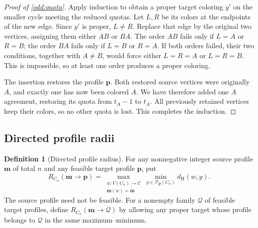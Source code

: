 \documentclass[11pt,reqno]{amsart}
\numberwithin{equation}{section}
\theoremstyle{definition}
\newtheorem{definition}[theorem]{Definition}
\theoremstyle{remark}
\begin{document}
\begin{proof}[Proof of \cref{odd:quota}]
Apply induction to obtain a proper target coloring $y'$ on the
smaller cycle meeting the reduced quotas. Let $L,R$ be its colors at
the endpoints of the new edge. Since $y'$ is proper, $L\ne R$.
Replace that edge by the original two vertices, assigning them
either $AB$ or $BA$. The order $AB$ fails only if $L=A$ or $R=B$;
the order $BA$ fails only if $L=B$ or $R=A$.
If both orders failed, their two conditions, together with $A\ne B$,
would force either $L=R=A$ or $L=R=B$. This is impossible, so at
least one order produces a proper coloring.

The insertion restores the profile $\mathbf p$. Both restored source
vertices were originally $A$, and exactly one has now been colored
$A$. We have therefore added one $A$ agreement, restoring its quota
from $t_A-1$ to $t_A$. All previously retained vertices keep their
colors, so no other quota is lost. This completes the induction.
\end{proof}

\subsection{Directed profile radii}

\begin{definition}[Directed profile radius]\label{odd:directed-definition}
For any nonnegative integer source profile $\mathbf m$ of total $n$
and any feasible target profile $\mathbf p$, put
\[
 R_{C_n}(\mathbf m\to\mathbf p)
 =\max_{\substack{w:V(C_n)\to\mathcal C\\\mathbf m(w)=\mathbf m}}
   \min_{y\in\mathcal P_{\mathbf p}(C_n)}d_{\mathrm H}(w,y).
\]
The source profile need not be feasible.
For a nonempty family $\mathcal Q$ of feasible target profiles, define
$R_{C_n}(\mathbf m\to\mathcal Q)$ by allowing any proper target whose
profile belongs to $\mathcal Q$ in the same maximum--minimum.
\end{definition}
\end{document}
